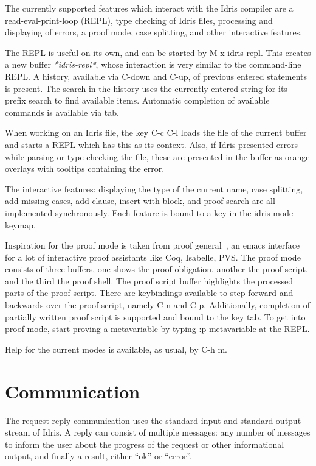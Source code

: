 \documentclass{article}
\begin{document}
The currently supported features which interact with the Idris compiler are a read-eval-print-loop (REPL), type checking of Idris files, processing and displaying of errors, a proof mode, case splitting, and other interactive features.

The REPL is useful on its own, and can be started by \textsf{M-x idris-repl}.
This creates a new buffer \emph{*idris-repl*}, whose interaction is very similar to the command-line REPL.
A history, available via C-down and C-up, of previous entered statements is present.
The search in the history uses the currently entered string for its prefix search to find available items.
Automatic completion of available commands is available via tab.

When working on an Idris file, the key C-c C-l loads the file of the current buffer and starts a REPL which has this as its context.
Also, if Idris presented errors while parsing or type checking the file, these are presented in the buffer as orange overlays with tooltips containing the error.

The interactive features: displaying the type of the current name, case splitting, add missing cases, add clause, insert with block, and proof search are all implemented synchronously.
Each feature is bound to a key in the idris-mode keymap.

Inspiration for the proof mode is taken from proof general~\cite{proofgeneral}, an emacs interface for a lot of interactive proof assistants like Coq, Isabelle, PVS.
The proof mode consists of three buffers, one shows the proof obligation, another the proof script, and the third the proof shell.
The proof script buffer highlights the processed parts of the proof script.
There are keybindings available to step forward and backwards over the proof script, namely C-n and C-p.
Additionally, completion of partially written proof script is supported and bound to the key tab.
To get into proof mode, start proving a metavariable by typing \textsf{:p metavariable} at the REPL.

Help for the current modes is available, as usual, by C-h m.

\section{Communication}\label{sec:protocol}
The request-reply communication uses the standard input and standard output stream of Idris.
A reply can consist of multiple messages: any number of messages to inform the user about the progress of the request or other informational output, and finally a result, either ``ok'' or ``error''.
\end{document}

